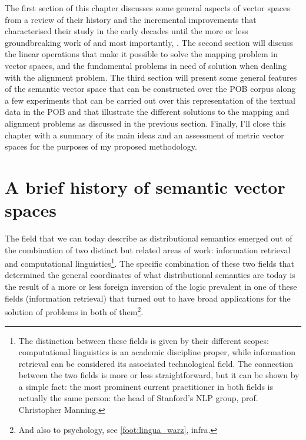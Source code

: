 The first section of this chapter discusses some general aspects of vector spaces from a review of their history and the incremental improvements that characterised their study in the early decades until the more or less groundbreaking work of \citet{mikolov2013,mikolov2013a,pennington2014} and most importantly, \citet{levy2014}.
The second section will discuss the linear operations that make it possible to solve the mapping problem in vector spaces, and the fundamental problems in need of solution when dealing with the alignment problem.
The third section will present some general features of the semantic vector space that can be constructed over the POB corpus along a few experiments that can be carried out over this representation of the textual data in the POB and that illustrate the different solutions to the mapping and alignment problems as discussed in the previous section.
Finally, I'll close this chapter with a summary of its main ideas and an assessment of metric vector spaces for the purposes of my proposed methodology.

\section{A brief history of semantic vector spaces}
\label{sec:wshist}

The field that we can today describe as distributional semantics emerged out of the combination of two distinct but related areas of work: information retrieval and computational linguistics\footnote{
    The distinction between these fields is given by their different scopes: computational linguistics is an academic discipline proper, while information retrieval can be considered its associated technological field.
    The connection between the two fields is more or less straightforward, but it can be shown by a simple fact: the most prominent current practitioner in both fields is actually the same person: the head of Stanford's NLP group, prof. Christopher Manning.
}.
The specific combination of these two fields that determined the general coordinates of what distributional semantics are today is the result of a more or less foreign inversion of the logic prevalent in one of these fields (information retrieval) that turned out to have broad applications for the solution of problems in both of them\footnote{
    And also to psychology, see \autoref{foot:lingua_warz}, infra.
}.

